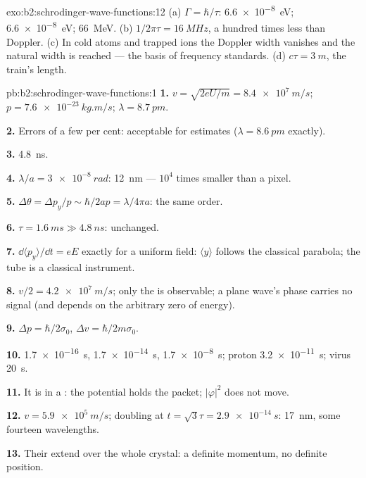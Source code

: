 \begin{solution}{exo:b2:schrodinger-wave-functions:12}
(a) $\Gamma = \hbar/\tau$: \qty{6.6e-8}{eV}; \qty{6.6e-8}{eV}; \qty{66}{MeV}. (b)
$1/2\pi\tau = \qty{16}{MHz}$, a hundred times less than Doppler. (c) In
cold atoms and trapped ions the Doppler width vanishes and the natural
width is reached --- the basis of frequency standards. (d) $c\tau =
\qty{3}{m}$, the train's length.
\end{solution}

\begin{solution}{pb:b2:schrodinger-wave-functions:1}
\textbf{1.} $v = \sqrt{2eU/m} = \qty{8.4e7}{m/s}$; $p = \qty{7.6e-23}{kg.m/s}$; $\lambda =
\qty{8.7}{pm}$.

\textbf{2.} Errors of a few per cent: acceptable for estimates ($\lambda =
\qty{8.6}{pm}$ exactly).

\textbf{3.} \qty{4.8}{ns}.

\textbf{4.} $\lambda/a = \qty{3e-8}{rad}$: \qty{12}{nm} --- $10^4$ times smaller than a
pixel.

\textbf{5.} $\Delta\theta = \Delta p_y/p \sim \hbar/2ap = \lambda/4\pi a$: the same order.

\textbf{6.} $\tau = \qty{1.6}{ms} \gg \qty{4.8}{ns}$: unchanged.

\textbf{7.} $\dd\langle p_y\rangle/\dd t = eE$ exactly for a uniform field:
$\langle y\rangle$ follows the classical parabola; the tube is a
classical instrument.

\textbf{8.} $v/2 = \qty{4.2e7}{m/s}$; only the  is observable;
a plane wave's phase carries no signal (and depends on the arbitrary
zero of energy).

\textbf{9.} $\Delta p = \hbar/2\sigma_0$, $\Delta v = \hbar/2m\sigma_0$.

\textbf{10.} \qty{1.7e-16}{s}, \qty{1.7e-14}{s}, \qty{1.7e-8}{s}; proton \qty{3.2e-11}{s};
virus \qty{20}{s}.

\textbf{11.} It is in a : the potential holds the
packet; $|\varphi|^2$ does not move.

\textbf{12.} $v = \qty{5.9e5}{m/s}$; doubling at $t = \sqrt3\tau = \qty{2.9e-14}{s}$:
\qty{17}{nm}, some fourteen wavelengths.

\textbf{13.} Their  extend over the whole crystal: a
definite momentum, no definite position.


\end{solution}
